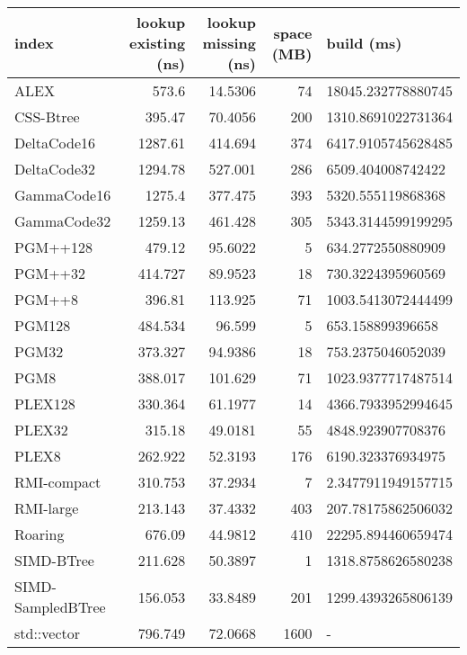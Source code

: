 \begin{tabular}{lrrrl}
\hline
 index             &   lookup existing (ns) &   lookup missing (ns) &   space (MB) & build (ms)         \\
\hline
 ALEX              &                573.6   &               14.5306 &           74 & 18045.232778880745 \\
 CSS-Btree         &                395.47  &               70.4056 &          200 & 1310.8691022731364 \\
 DeltaCode16       &               1287.61  &              414.694  &          374 & 6417.9105745628485 \\
 DeltaCode32       &               1294.78  &              527.001  &          286 & 6509.404008742422  \\
 GammaCode16       &               1275.4   &              377.475  &          393 & 5320.555119868368  \\
 GammaCode32       &               1259.13  &              461.428  &          305 & 5343.3144599199295 \\
 PGM++128          &                479.12  &               95.6022 &            5 & 634.2772550880909  \\
 PGM++32           &                414.727 &               89.9523 &           18 & 730.3224395960569  \\
 PGM++8            &                396.81  &              113.925  &           71 & 1003.5413072444499 \\
 PGM128            &                484.534 &               96.599  &            5 & 653.158899396658   \\
 PGM32             &                373.327 &               94.9386 &           18 & 753.2375046052039  \\
 PGM8              &                388.017 &              101.629  &           71 & 1023.9377717487514 \\
 PLEX128           &                330.364 &               61.1977 &           14 & 4366.7933952994645 \\
 PLEX32            &                315.18  &               49.0181 &           55 & 4848.923907708376  \\
 PLEX8             &                262.922 &               52.3193 &          176 & 6190.323376934975  \\
 RMI-compact       &                310.753 &               37.2934 &            7 & 2.3477911949157715 \\
 RMI-large         &                213.143 &               37.4332 &          403 & 207.78175862506032 \\
 Roaring           &                676.09  &               44.9812 &          410 & 22295.894460659474 \\
 SIMD-BTree        &                211.628 &               50.3897 &            1 & 1318.8758626580238 \\
 SIMD-SampledBTree &                156.053 &               33.8489 &          201 & 1299.4393265806139 \\
 std::vector       &                796.749 &               72.0668 &         1600 & -                  \\
\hline
\end{tabular}